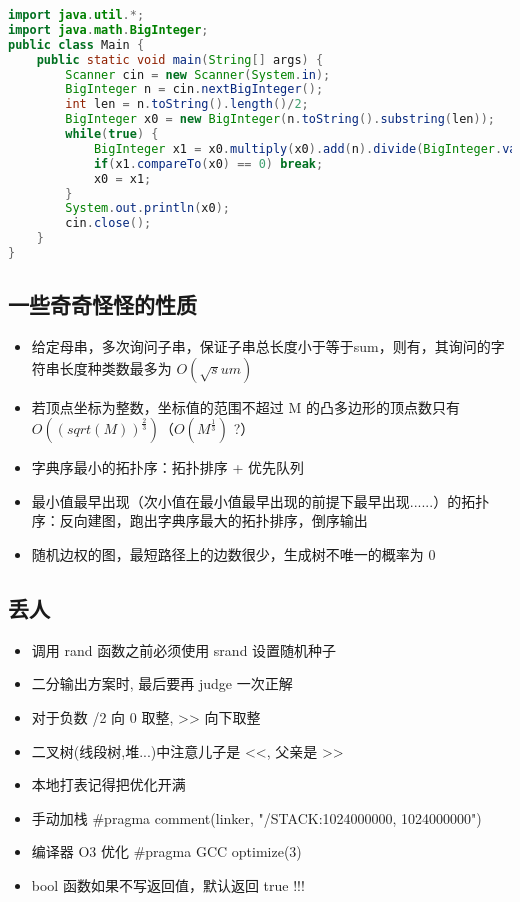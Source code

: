 \begin{lstlisting}[language=java]
import java.util.*;
import java.math.BigInteger;
public class Main {
    public static void main(String[] args) {
        Scanner cin = new Scanner(System.in);
        BigInteger n = cin.nextBigInteger();
        int len = n.toString().length()/2;
        BigInteger x0 = new BigInteger(n.toString().substring(len));
        while(true) {
            BigInteger x1 = x0.multiply(x0).add(n).divide(BigInteger.valueOf(2).multiply(x0));
            if(x1.compareTo(x0) == 0) break;
            x0 = x1;
        }
        System.out.println(x0);
        cin.close();
    }
}
\end{lstlisting}


\subsection{一些奇奇怪怪的性质}

\begin{itemize}
    \item 给定母串，多次询问子串，保证子串总长度小于等于sum，则有，其询问的字符串长度种类数最多为 $O(\sqrt sum)$
    \item 若顶点坐标为整数，坐标值的范围不超过 M 的凸多边形的顶点数只有 $O((sqrt(M))^\frac{2}{3}) （O(M^\frac{1}{3})$ ?）
    \item 字典序最小的拓扑序：拓扑排序 + 优先队列
    \item 最小值最早出现（次小值在最小值最早出现的前提下最早出现......）的拓扑序：反向建图，跑出字典序最大的拓扑排序，倒序输出
    \item 随机边权的图，最短路径上的边数很少，生成树不唯一的概率为 0
\end{itemize}

\subsection{丢人}

\begin{itemize}
    \item 调用 rand 函数之前必须使用 srand 设置随机种子
    \item 二分输出方案时, 最后要再 judge 一次正解
    \item 对于负数 /2 向 0 取整, >> 向下取整
    \item 二叉树(线段树,堆...)中注意儿子是 <<, 父亲是 >>
    \item 本地打表记得把优化开满
    \item 手动加栈 #pragma comment(linker, "/STACK:1024000000, 1024000000")
    \item 编译器 O3 优化 #pragma GCC optimize(3)
    \item bool 函数如果不写返回值，默认返回 true !!!
\end{itemize}